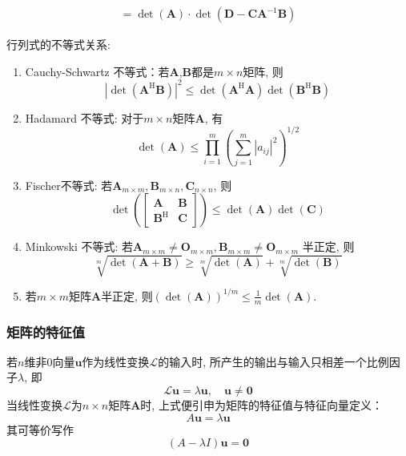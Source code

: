 \documentclass[lang=cn,10pt]{gorgeousnbook}
\numberwithin{equation}{section}%
\numberwithin{figure}{section}%
\begin{document}
\begin{enumerate}
\begin{equation}
\begin{gathered}
        =\det(\boldsymbol{A})\cdot\det(\boldsymbol{D}-\boldsymbol{C}\boldsymbol{A}^{-1}\boldsymbol{B}) 
        \end{gathered}
    \end{equation}
\end{enumerate}
行列式的不等式关系:
\begin{enumerate}
    \item Cauchy-Schwartz 不等式：若$\bm{A}$,$\bm{B}$都是$m\times n$矩阵, 则
    \begin{equation}    |\det(\boldsymbol{A^\mathrm{H}}\boldsymbol{B})|^2\leqslant\det(\boldsymbol{A^\mathrm{H}}\boldsymbol{A})\det(\boldsymbol{B^\mathrm{H}}\boldsymbol{B})
    \end{equation}
    \item Hadamard 不等式: 对于$m\times n$矩阵$\bm{A}$, 有
    \begin{equation}
        \det(\boldsymbol{A})\leqslant\prod_{i=1}^m\left(\sum_{j=1}^m|a_{ij}|^2\right)^{1/2}
    \end{equation}
    \item Fischer不等式: 若$\bm{A}_{m\times m},\bm{B}_{m\times n},\bm{C}_{n\times n}$, 则
    \begin{equation}
\det\left(\begin{bmatrix}\bm{A}&\bm{B}\\\bm{B}^\mathrm{H}&\bm{C}\end{bmatrix}\right)\leqslant\det(\bm{A})\det(\bm{C})
    \end{equation}
    \item Minkowski 不等式: 若$\bm{A}_{m\times m}\neq \bm{O}_{m\times m},\bm{B}_{m\times m}\neq \bm{O}_{m\times m}$ 半正定, 则
    \begin{equation}
    \sqrt[m]{\det(\bm{A}+\bm{B})}\geqslant\sqrt[m]{\det(\bm{A})}+\sqrt[m]{\det(\bm{B})}
    \end{equation}
    \item 若$m\times m$矩阵$\bm{A}$半正定, 则$(\det(\boldsymbol{A}))^{1/m}\leqslant\frac1m\det(\boldsymbol{A})$. 
\end{enumerate}

\subsubsection{矩阵的特征值}
若$n$维非0向量$\bm{u}$作为线性变换$\mathcal{L} $的输入时, 所产生的输出与输入只相差一个比例因子$\lambda$, 即
\begin{equation} 
\mathcal{L}\boldsymbol{u}=\lambda\boldsymbol{u},\quad\boldsymbol{u}\neq\boldsymbol{0}
\end{equation}
当线性变换$\mathcal{L} $为$n \times n$矩阵$\bm{A}$时, 上式便引申为矩阵的特征值与特征向量定义：
\begin{equation}
    A\boldsymbol{u}=\lambda\boldsymbol{u}
\end{equation}
其可等价写作
\begin{equation}
(A-\lambda I)\boldsymbol{u}=\mathbf{0}
\end{equation}
\end{document}
